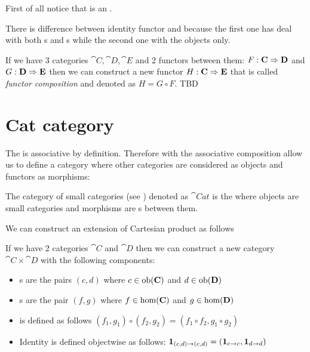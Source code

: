 \begin{remark}
  \label{rem:idfunctor}
  First of all notice that  is an
  .

  There is difference between identity functor and 
  because the first one has deal with both s and
  s while the second one with the objects
  only. 
\end{remark}

\begin{definition}
  \label{def:functor_composition}
  If we have 3 categories $\cat{C}, \cat{D}, \cat{E}$ and 2 functors
  between them: $F: \mathbf{C} \Rightarrow \mathbf{D}$ and $G: \mathbf{D} \Rightarrow \mathbf{E}$
  then we can construct a new functor $H: \mathbf{C} \Rightarrow \mathbf{E}$ that is
  called \textit{functor composition} and denoted as $H = G \circ F$.
  TBD
\end{definition}

\section{\textbf{Cat} category}
The  is associative by definition.
Therefore  with the associative composition
allow us to define a category where other categories are considered as
objects and functors as morphisms: 
\begin{definition}
  \label{def:catcategory}
  The category of small categories (see )
  denoted as $\cat{Cat}$ is the  where objects
  are small categories and morphisms are s
  between them.
\end{definition}

We can construct an extension of Cartesian product as follows
\begin{definition}
  \label{def:category_product}
  If we have 2 categories $\cat{C}$ and $\cat{D}$ then we can construct
  a new category $\cat{C} \times \cat{D}$ with the following components:
  \begin{itemize}
  \item {}s are the pairs $(c,d)$ where $c \in
    \mathrm{ob}(\mathbf{C})$ and $d \in \mathrm{ob}(\mathbf{D})$
  \item {}s are the pair $(f,g)$ where $f \in
    \mathrm{hom}(\mathbf{C})$ and $g \in \mathrm{hom}(\mathbf{D})$
  \item {} is defined as follows 
    \(
    (f_1, g_1) \circ (f_2, g_2) = (f_1 \circ f_2, g_1 \circ g_2)
    \)
  \item Identity is defined objectwise as follows:
    $\mathbf{1}_{ (c,d) \to (c,d) } = \left(\mathbf{1}_{ c \to c }, \mathbf{1}_{ d \to d }\right)$
  \end{itemize}
\end{definition}


